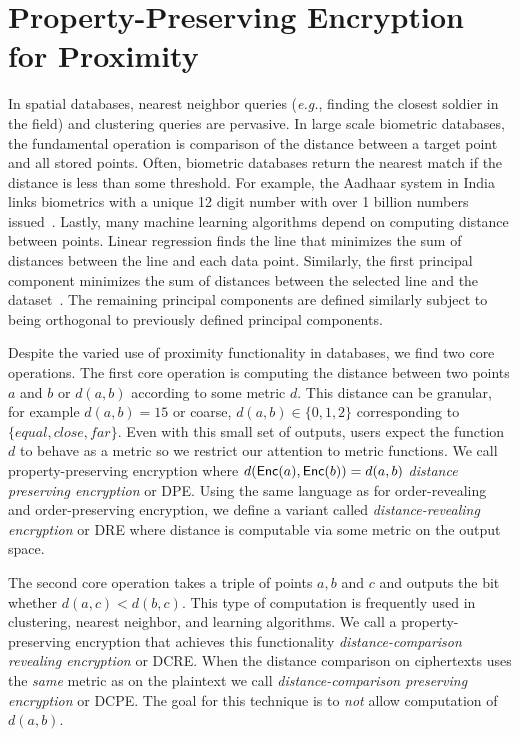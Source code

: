 
\section{Property-Preserving Encryption for Proximity}
\label{sec:ppe}

In spatial databases, nearest neighbor queries (\emph{e.g.}, finding the closest soldier in the field) and clustering queries are pervasive.  %
In large scale biometric databases, the fundamental operation is comparison of the distance between a target point and all stored points. Often, biometric databases return the nearest match if the distance is less than some threshold.  For example, the Aadhaar system in India links biometrics with a unique 12 digit number with over 1 billion numbers issued~\cite{daugman2014600}.  Lastly, many machine learning algorithms depend on computing distance between points. Linear regression finds the line that minimizes the sum of distances between the line and each data point.  Similarly, the first principal component minimizes the sum of distances between the selected line and the dataset~\cite{wold1987principal}.  The remaining principal components are defined similarly subject to being orthogonal to previously defined principal components.

Despite the varied use of proximity functionality in databases, we find two core operations.     The first core operation is computing the distance between two points $a$ and $b$ or $d(a,b)$ according to some metric $d$.  This distance can be granular, for example $d(a, b) =15$ or coarse, $d(a,b)\in\{0,1,2\}$ corresponding to $\{equal, close, far\}$.  Even with this small set of outputs, users expect the function $d$ to behave as a metric so we restrict our attention to metric functions.  We call property-preserving encryption where $d(\mathsf{Enc}(a), \mathsf{Enc}(b)) = d(a,b)$ \emph{distance preserving encryption} or DPE.  Using the same language as for order-revealing and order-preserving encryption, we define a variant called \emph{distance-revealing encryption} or DRE where distance is computable  via some metric on the output space.

The second core operation takes a triple of points $a,b$ and $c$ and outputs the bit whether $d(a,c)<d(b,c)$.  This type of computation is frequently used in clustering, nearest neighbor, and learning algorithms.   We call a property-preserving encryption that achieves this functionality \emph{distance-comparison revealing encryption} or DCRE. When the distance comparison on ciphertexts uses the \emph{same} metric as on the plaintext we call \emph{distance-comparison preserving encryption} or DCPE.  The goal for this technique is to \emph{not} allow computation of $d(a,b)$.

